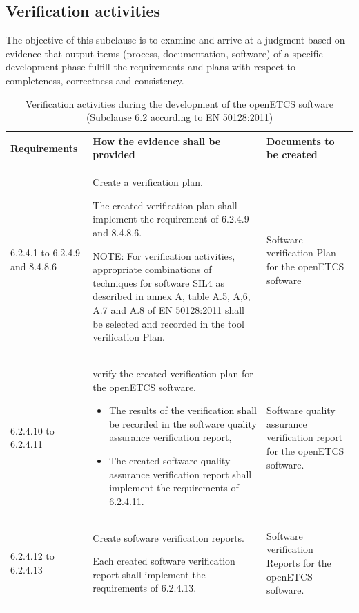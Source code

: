 \documentclass{template/openetcs_report}
\begin{document}
\subsection{Verification activities}
\begin{flushleft}
The objective of this subclause is to examine and arrive at a judgment based on evidence that output items (process, documentation, software) of a specific development phase fulfill the requirements and plans with respect to completeness, correctness and consistency.
\end{flushleft}
{\footnotesize\sffamily\centering
\begin{longtable}{|p{2cm}|p{9cm}|p{3cm}|}
\caption{Verification activities during the development of the openETCS software (Subclause 6.2 according to EN 50128:2011)}\\
\hline
\bfseries Requirements & \bfseries How the evidence shall be provided & \bfseries Documents to be created\\
\hline
\hline
\endhead
\hline
\endfoot

6.2.4.1 to 6.2.4.9 and 8.4.8.6 & Create a verification plan.

The created verification plan shall implement the requirement of 6.2.4.9 and 8.4.8.6.

NOTE: \linebreak For verification activities, appropriate combinations of techniques for software SIL4 as described in annex A, table A.5, A,6, A.7 and A.8 of EN 50128:2011 shall be selected and recorded in the tool
verification Plan.
& Software verification Plan for the openETCS software \\ 
\hline
6.2.4.10 to 6.2.4.11 & verify the created verification plan for the openETCS software. 
\begin{itemize}\itemsep=0pt
  \item The results of the verification shall be recorded in the software quality assurance verification report,
  \item The created software quality assurance verification report shall implement the requirements of 6.2.4.11. 
\end{itemize}
& Software quality assurance verification report for the openETCS software.\\ 
\hline
6.2.4.12 to 6.2.4.13 & Create software verification reports.

Each created software verification report shall implement the requirements of 6.2.4.13.
& Software verification Reports for the openETCS software.\\ 
\hline
\end{longtable}}
\end{document}
